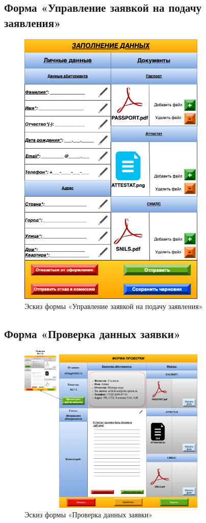 \documentclass[areasetadvanced]{scrartcl}
\begin{document}
\subsection{Форма «Управление заявкой на подачу заявления»}
\begin{figure}[H]
\centering
\includegraphics[width=0.8\textwidth]{images/FINAL_ABIII.png}
\caption{Эскиз формы «Управление заявкой на подачу заявления»}
\end{figure}

\subsection{Форма «Проверка данных заявки»}
\begin{figure}[H]
\centering
\includegraphics[width=0.8\textwidth]{images/Kommissiya.png}
\caption{Эскиз формы «Проверка данных заявки»}
\end{figure}
\end{document}
